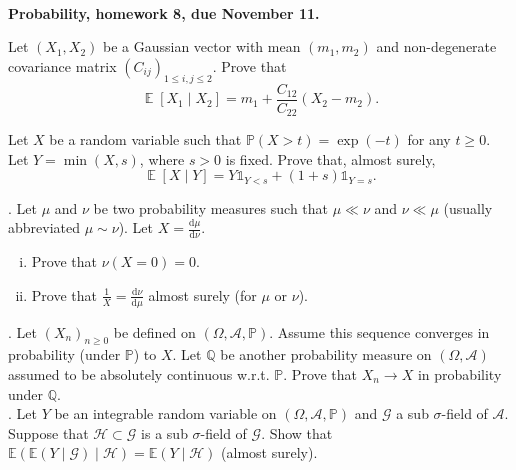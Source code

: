\documentclass[11pt,reqno]{amsart}
\renewcommand{\P}{{\mathbb{P}}}
\DeclareMathOperator{\E}{\mathbb{E}}      %
\newcommand{\1}{\mathds{1}}
\newcommand{\rd}{{\mathrm{d}}}            %
\theoremstyle{definition}
\theoremstyle{remark}
\numberwithin{equation}{section}
\begin{document}
~\vspace{-1cm}



\begin{center}
{\bf Probability, homework 8, due November 11.}
\end{center}
\vspace{0.5cm}
\small




Let $(X_1,X_2)$ be a Gaussian vector with mean $(m_1,m_2)$ and non-degenerate covariance matrix $(C_{ij})_{1\leq i,j\leq 2}$.   
Prove that
$$
\E[X_1\mid X_2]=m_1+\frac{C_{12}}{C_{22}}(X_2-m_2).
$$






Let $X$ be a random variable such that $\P(X>t)=\exp(-t)$ for any $t\geq 0$. Let $Y=\min(X,s)$, where $s>0$ is fixed.
Prove that, almost surely,
$$
\E[X\mid Y]=Y\1_{Y<s}+(1+s)\1_{Y=s}.
$$

.  Let $\mu$ and $\nu$ be two probability measures such that $\mu\ll \nu$ and $\nu\ll\mu$ (usually abbreviated $\mu\sim\nu$). Let $X=\frac{\rd \mu}{\rd\nu}$.

\begin{enumerate}[(i)]
\item Prove that $\nu(X=0)=0$.
\item Prove that  $ \frac{1}{X}=\frac{\rd \nu}{\rd\mu}$  almost surely (for $\mu$ or $\nu$).
\end{enumerate}




 .   Let $(X_n)_{n\geq 0}$ be defined on  $(\Omega, \mathcal{A}, \mathbb{P})$. Assume this sequence converges in probability (under $\mathbb{P}$) to
$X$. Let $\mathbb{Q}$ be another probability measure on $(\Omega, \mathcal{A})$ assumed to be absolutely continuous w.r.t. $\mathbb{P}$. Prove that
$X_n\to X$ in probability under $\mathbb{Q}$.\\


. Let $Y$ be an integrable random variable on $(\Omega,\mathcal{A},\mathbb{P})$ and $\mathcal{G}$ a sub $\sigma$-field of $\mathcal{A}$. Suppose that $\mathcal{H}\subset\mathcal{G}$ is a sub $\sigma$-field of $\mathcal{G}$. Show that
$\mathbb{E}\left(\mathbb{E}(Y\mid \mathcal{G})\mid\mathcal{H}\right)=\mathbb{E}\left(Y\mid \mathcal{H}\right)$ (almost surely).\\
\end{document}
